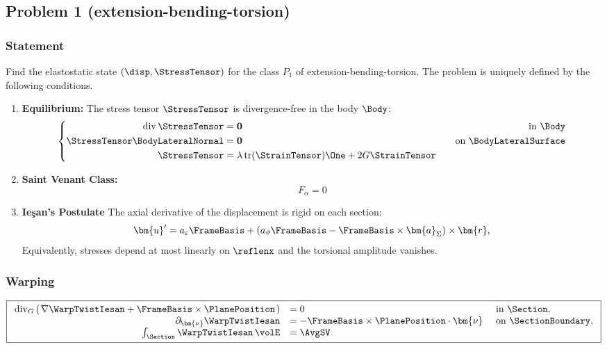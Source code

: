 \subsection{Problem 1 (extension-bending-torsion)}
\subsubsection{Statement}

Find the elastostatic state $(\disp, \StressTensor)$ for the class \(P_1\) of extension-bending-torsion. 
The problem is uniquely defined by the following conditions.

\begin{enumerate}
    \item \textbf{Equilibrium:} The stress tensor $\StressTensor$ is divergence-free in the body $\Body$:
    \begin{equation}
    \left\{
        \begin{aligned}
        \operatorname{div} \StressTensor &= \mathbf{0} & \quad\text{in } \Body \\
        \StressTensor \BodyLateralNormal&= \mathbf{0}& \quad \text{on } \BodyLateralSurface \\
        \StressTensor &= \lambda \operatorname{tr}(\StrainTensor) \One + 2G \StrainTensor
        \end{aligned}
    \right.
    \end{equation}

    \item \textbf{Saint Venant Class:} 
    \[
    F_\alpha=0
    \]

    \item \textbf{Ie\c{s}an's Postulate}
    The axial derivative of the displacement is rigid on each section:
    \begin{equation}
    \bm{u}'= a_{\varepsilon} \FrameBasis + (a_{\vartheta} \FrameBasis -\FrameBasis\times\bm{a}_{\Sigma}) \times \bm{r},
    \end{equation}
    Equivalently, stresses depend at most linearly on $\reflenx$ and the torsional amplitude vanishes.
\end{enumerate}

\subsubsection{Warping}
\begin{equation}
\boxed{
\begin{array}{rll}
\operatorname{div}_G\left(\left.\nabla \WarpTwistIesan+\FrameBasis \times\PlanePosition\right.\right) &=0 & \text { in } \Section, \\
\partial_{\bm{\nu}} \WarpTwistIesan &=-\FrameBasis\times\PlanePosition \cdot \bm{\nu} & \text { on } \SectionBoundary, \\
\int_{\Section} \WarpTwistIesan\, \volE &= \AvgSV
\end{array}
}
\end{equation}

